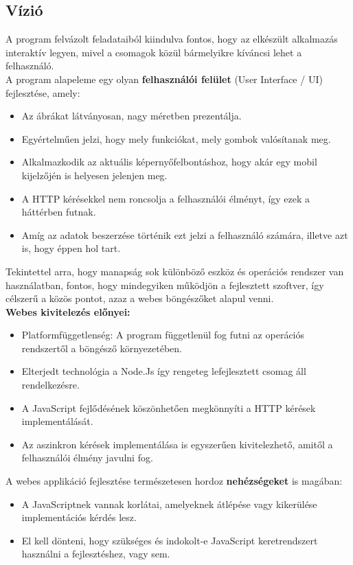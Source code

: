 \pagebreak

	\subsection{Vízió}
	
	A program felvázolt feladataiból kiindulva fontos, hogy az elkészült alkalmazás interaktív legyen, mivel a csomagok közül bármelyikre kíváncsi lehet a felhasználó.\\
	
	A program alapeleme egy olyan \textbf{felhasználói felület} (User Interface / UI) fejlesztése, amely: 
	
	\begin{itemize}
		\item Az ábrákat látványosan, nagy méretben prezentálja.
		\item Egyértelműen jelzi, hogy mely funkciókat, mely gombok valósítanak meg.
		\item Alkalmazkodik az aktuális képernyőfelbontáshoz, hogy akár egy mobil kijelzőjén is helyesen jelenjen meg.
		\item A HTTP kérésekkel nem roncsolja a felhasználói élményt, így ezek a háttérben futnak.
		\item Amíg az adatok beszerzése történik ezt jelzi a felhasználó számára, illetve azt is, hogy éppen hol tart.
	\end{itemize}
	
	Tekintettel arra, hogy manapság sok különböző eszköz és operációs rendszer van használatban, fontos, hogy mindegyiken működjön a fejlesztett szoftver, így célszerű a közös pontot, azaz a webes böngészőket alapul venni.\\
	 
	\textbf{Webes kivitelezés előnyei:}
	\begin{itemize}
		\item Platformfüggetlenség: A program függetlenül fog futni az operációs rendszertől a böngésző környezetében.
		\item Elterjedt technológia a Node.Js így rengeteg lefejlesztett csomag áll rendelkezésre.
		\item A JavaScript fejlődésének köszönhetően megkönnyíti a HTTP kérések implementálását.
		\item Az aszinkron kérések implementálása is egyszerűen kivitelezhető, amitől a felhasználói élmény javulni fog. 
	\end{itemize}
	
	\noindent A webes applikáció fejlesztése természetesen hordoz \textbf{nehézségeket} is magában:
	\begin{itemize}
		\item A JavaScriptnek vannak korlátai, amelyeknek átlépése vagy kikerülése implementációs kérdés lesz.
		\item El kell dönteni, hogy szükséges és indokolt-e JavaScript keretrendszert használni a fejlesztéshez, vagy sem.
	\end{itemize}
	
